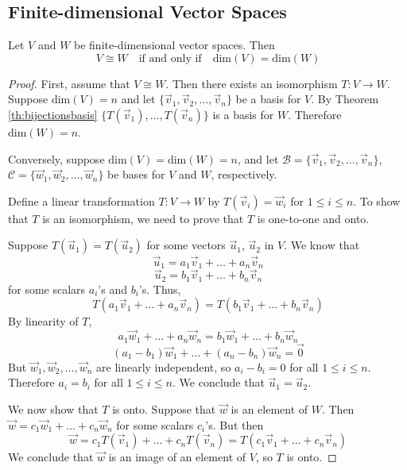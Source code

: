 \documentclass{ximera}
\begin{document}
 
\subsection{Finite-dimensional Vector Spaces}

\begin{theorem}\label{th:ndimspacesisorn}
Let $V$ and $W$ be finite-dimensional vector spaces. Then
$$V\cong W\quad\text{if and only if}\quad \mbox{dim}(V)=\mbox{dim}(W)$$
\end{theorem}
\begin{proof}
First, assume that $V\cong W$.  Then there exists an isomorphism $T:V\rightarrow W$.  Suppose $\mbox{dim}(V)=n$ and let $\{\vec{v}_1,\vec{v}_2,\ldots ,\vec{v}_n\}$ be a basis for $V$. By Theorem \ref{th:bijectionsbasis} $\{T(\vec{v}_1),\ldots ,T(\vec{v}_n)\}$ is a basis for $W$. Therefore $\mbox{dim}(W)=n$.

Conversely, suppose $\mbox{dim}(V)=\mbox{dim}(W)=n$, and let $\mathcal{B}=\{\vec{v}_1,\vec{v}_2,\ldots ,\vec{v}_n\}$, $\mathcal{C}=\{\vec{w}_1,\vec{w}_2,\ldots ,\vec{w}_n\}$ be bases for $V$ and $W$, respectively.

Define a linear transformation $T:V\rightarrow W$ by $T(\vec{v}_i)=\vec{w}_i$ for $1\leq i\leq n$.  To show that $T$ is an isomorphism, we need to prove that $T$ is one-to-one and onto.

Suppose $T(\vec{u}_1)=T(\vec{u}_2)$ for some vectors $\vec{u}_1$, $\vec{u}_2$ in $V$.  We know that
$$\vec{u}_1=a_1\vec{v}_1+\ldots +a_n\vec{v}_n$$
$$\vec{u}_2=b_1\vec{v}_1+\ldots +b_n\vec{v}_n$$
for some scalars $a_i$'s and $b_i$'s.  Thus,
$$T(a_1\vec{v}_1+\ldots +a_n\vec{v}_n)=T(b_1\vec{v}_1+\ldots +b_n\vec{v}_n)$$
By linearity of $T$,
$$a_1\vec{w}_1+\ldots +a_n\vec{w}_n=b_1\vec{w}_1+\ldots +b_n\vec{w}_n$$
$$(a_1-b_1)\vec{w}_1+\ldots +(a_n-b_n)\vec{w}_n=\vec{0}$$
But $\vec{w}_1,\vec{w}_2,\ldots ,\vec{w}_n$ are linearly independent, so $a_i-b_i=0$ for all $1\leq i\leq n$.  Therefore $a_i=b_i$ for all $1\leq i\leq n$.  We conclude that $\vec{u}_1=\vec{u}_2$.

We now show that $T$ is onto. Suppose that $\vec{w}$ is an element of $W$.  Then $\vec{w}=c_1\vec{w}_1+\ldots +c_n\vec{w}_n$ for some scalars $c_i$'s.  But then
$$\vec{w}=c_1T(\vec{v}_1)+\ldots +c_nT(\vec{v}_n)=T(c_1\vec{v}_1+\ldots +c_n\vec{v}_n)$$
We conclude that $\vec{w}$ is an image of an element of $V$, so $T$ is onto.
\end{proof}
\end{document}
